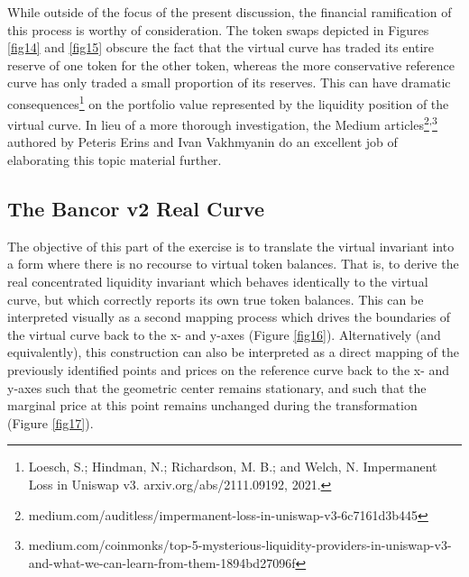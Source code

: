 \documentclass{article}
\begin{document}
While outside of the focus of the present discussion, the financial ramification of this process is worthy of consideration. The token swaps depicted in Figures \ref{fig14} and \ref{fig15} obscure the fact that the virtual curve has traded its entire reserve of one token for the other token, whereas the more conservative reference curve has only traded a small proportion of its reserves. This can have dramatic consequences\footnote{Loesch, S.; Hindman, N.; Richardson, M. B.; and Welch, N. Impermanent Loss in Uniswap v3. arxiv.org/abs/2111.09192, 2021.} on the portfolio value represented by the liquidity position of the virtual curve. In lieu of a more thorough investigation, the Medium articles\footnote{medium.com/auditless/impermanent-loss-in-uniswap-v3-6c7161d3b445}\textsuperscript{,}\footnote{medium.com/coinmonks/top-5-mysterious-liquidity-providers-in-uniswap-v3-and-what-we-can-learn-from-them-1894bd27096f} authored by Peteris Erins and Ivan Vakhmyanin do an excellent job of elaborating this topic material further. 

\subsection{The Bancor v2 Real Curve}\label{subsec3.2}

The objective of this part of the exercise is to translate the virtual invariant into a form where there is no recourse to virtual token balances. That is, to derive the real concentrated liquidity invariant which behaves identically to the virtual curve, but which correctly reports its own true token balances. This can be interpreted visually as a second mapping process which drives the boundaries of the virtual curve back to the x- and y-axes (Figure \ref{fig16}). Alternatively (and equivalently), this construction can also be interpreted as a direct mapping of the previously identified points and prices on the reference curve back to the x- and y-axes such that the geometric center remains stationary, and such that the marginal price at this point remains unchanged during the transformation (Figure \ref{fig17}).
\end{document}
